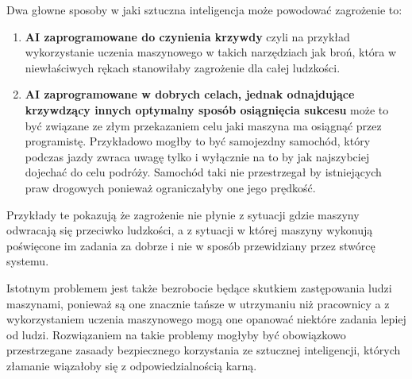 Dwa głowne sposoby w jaki sztuczna inteligencja może powodować zagrożenie to:
\begin{enumerate}
    \item \textbf{AI zaprogramowane do czynienia krzywdy} czyli na przykład wykorzystanie uczenia maszynowego
    w takich narzędziach jak broń, która w niewłaściwych rękach stanowiłaby zagrożenie dla całej ludzkości.
    \item \textbf{AI zaprogramowane w dobrych celach, jednak odnajdujące krzywdzący innych optymalny
    sposób osiągnięcia sukcesu} może to być związane ze złym przekazaniem celu jaki maszyna ma osiągnąć przez 
    programistę. Przykładowo mogłby to być samojezdny samochód, który podczas jazdy zwraca uwagę tylko i wyłącznie 
    na to by jak najszybciej dojechać do celu podróży. Samochód taki nie przestrzegał by istniejących praw drogowych
    ponieważ ograniczałyby one jego prędkość.
\end{enumerate}
Przykłady te pokazują że zagrożenie nie płynie z sytuacji gdzie maszyny odwracają się przeciwko ludzkości, a 
z sytuacji w której maszyny wykonują poświęcone im zadania za dobrze i nie w sposób przewidziany przez 
stwórcę systemu.

Istotnym problemem jest także bezrobocie będące skutkiem zastępowania ludzi maszynami,
ponieważ są one znacznie tańsze w utrzymaniu niż pracownicy a z wykorzystaniem uczenia
maszynowego mogą one opanować niektóre zadania lepiej od ludzi.
Rozwiązaniem na takie problemy mogłyby być obowiązkowo przestrzegane zasaady bezpiecznego korzystania
ze sztucznej inteligencji, których złamanie wiązałoby się z odpowiedzialnością karną.
